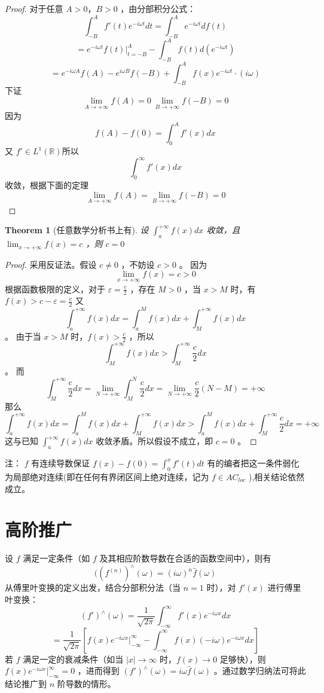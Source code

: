 \documentclass[linespread=1.5,openany]{book}%
\theoremstyle{plain}
\newtheorem{theorem}{Theorem}
\begin{document}
{{				\begin{proof}
					对于任意 \(A>0\)，\(B>0\) ，由分部积分公式：
					\[
					\int_{-B}^{A}f'(t)e^{-i\omega t}dt=\int_{-B}^{A}e^{-i\omega t}df(t)\]
					\[=e^{-i\omega t}f(t)\big|_{t = -B}^{A}-\int_{-B}^{A}f(t)d(e^{-i\omega t})\]
					\[=e^{-i\omega A}f(A)-e^{i\omega B}f(-B)+\int_{-B}^{A}f(x)e^{-i\omega t}\cdot(i\omega)	\]
					下证\[\lim_{A\to +\infty}f(A)=0\ \lim_{B\to +\infty}f(-B)=0\] 
					因为 \[f(A)-f(0)=\int_{0}^{A}f'(x)dx\] 又 \(f'\in L^1(\mathbb{R})\)所以 \[\int_{0}^{\infty}f'(x)dx\] 收敛，根据下面的定理 \[\lim_{A\to +\infty}f(A)=\lim_{B\to +\infty}f(-B)=0\] 
				\end{proof}
				\begin{theorem}[任意数学分析书上有]
					设 \(\int_{a}^{+\infty}f(x)dx\) 收敛，且 \(\lim_{x \to +\infty}f(x)=c\) ，则 \(c = 0\)
				\end{theorem}
				\begin{proof}
					采用反证法。假设 \(c\neq 0\) ，不妨设 \(c>0\) 。
					因为 \[\lim_{x \to +\infty}f(x)=c>0\] 根据函数极限的定义，对于 \(\varepsilon = \frac{c}{2}\) ，存在 \(M > 0\) ，当 \(x > M\) 时，有 \(f(x)>c - \varepsilon = \frac{c}{2}\) 又 \[\int_{a}^{+\infty}f(x)dx=\int_{a}^{M}f(x)dx+\int_{M}^{+\infty}f(x)dx\] 。
					由于当 \(x > M\) 时，\(f(x)>\frac{c}{2}\) ，所以 \[\int_{M}^{+\infty}f(x)dx>\int_{M}^{+\infty}\frac{c}{2}dx\] 。
					而 \[\int_{M}^{+\infty}\frac{c}{2}dx=\lim_{N \to +\infty}\int_{M}^{N}\frac{c}{2}dx=\lim_{N \to +\infty}\frac{c}{2}(N - M)=+\infty\] 
					那么 \[\int_{a}^{+\infty}f(x)dx=\int_{a}^{M}f(x)dx+\int_{M}^{+\infty}f(x)dx> \int_{a}^{M}f(x)dx+\int_{M}^{+\infty}\frac{c}{2}dx = +\infty\]
					这与已知 \(\int_{a}^{+\infty}f(x)dx\) 收敛矛盾。所以假设不成立，即 \(c = 0\) 。
				\end{proof}
				注： \(f\) 有连续导数保证 \(f(x) - f(0)=\int_{0}^{x}f'(t)dt\) 有的编者把这一条件弱化为局部绝对连续(即在任何有界闭区间上绝对连续，记为 \(f\in AC_{loc}\) ),相关结论依然成立。
				\section*{高阶推广}
				设 \(f\) 满足一定条件（如 \(f\) 及其相应阶数导数在合适的函数空间中），则有 \[((f^{(n)})^{\wedge}(\omega)=(i\omega)^n\hat{f}(\omega)\] 
				从傅里叶变换的定义出发，结合分部积分法（当 \(n = 1\) 时），对 \(f'(x)\) 进行傅里叶变换：
				\[(f')^{\wedge}(\omega)=\frac{1}{\sqrt{2\pi}}\int_{-\infty}^{\infty}f'(x)e^{-i\omega x}dx\]
				\[=\frac{1}{\sqrt{2\pi}}\left[f(x)e^{-i\omega x}\big|_{-\infty}^{\infty}- \int_{-\infty}^{\infty}f(x)(-i\omega)e^{-i\omega x}dx\right]
				\]
				若 \(f\) 满足一定的衰减条件（如当 \(|x|\to\infty\) 时，\(f(x)\to 0\) 足够快），则 \(f(x)e^{-i\omega x}\big|_{-\infty}^{\infty}=0\) ，进而得到 \((f')^{\wedge}(\omega)=i\omega\hat{f}(\omega)\) 。通过数学归纳法可将此结论推广到 \(n\) 阶导数的情形。
				
			}
		}
	
\end{document}
